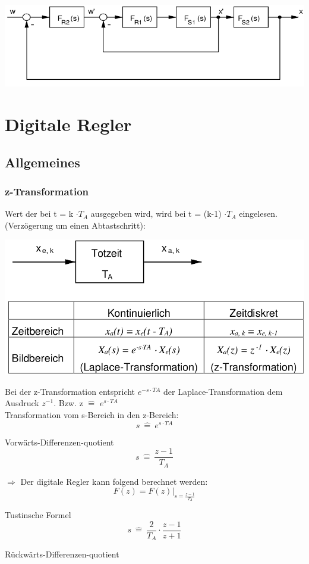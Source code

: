 \documentclass[10pt,a4paper]{article}
\begin{document}
\includegraphics[width=0.9\columnwidth]{Figures/Kaskadenregelung.png}

\section{Digitale Regler}
\subsection{Allgemeines}
\subsubsection{z-Transformation}

Wert der bei t = k $\cdot T_A$ ausgegeben wird, wird bei t = (k-1) $\cdot T_A$
eingelesen. (Verzögerung um einen Abtastschritt):

\includegraphics[width=0.9\columnwidth]{Figures/zTrans.png}

Bei der z-Transformation entspricht $e^{-s \cdot TA}$ der
Laplace-Transformation dem Ausdruck $z^{-1}$. Bzw. z $\hat{=}$ $e^{s \cdot
			TA}$\\ Transformation vom s-Bereich in den z-Bereich:
\[
	s \ \hat{=}\  e^{s \cdot TA}
\]

Vorwärts-Differenzen-quotient
\[
	s \ \hat{=} \ \frac{z-1}{T_A}
\]

$\Rightarrow$ Der digitale Regler kann folgend berechnet werden:
\[
	F(z) = F(z)|_{s= \frac {z-1}{T_A}}
\]

Tustinsche Formel
\[
	s \ \hat{=} \ \frac{2}{T_A} \cdot \frac{z-1}{z+1}
\]

Rückwärts-Differenzen-quotient
\end{document}
